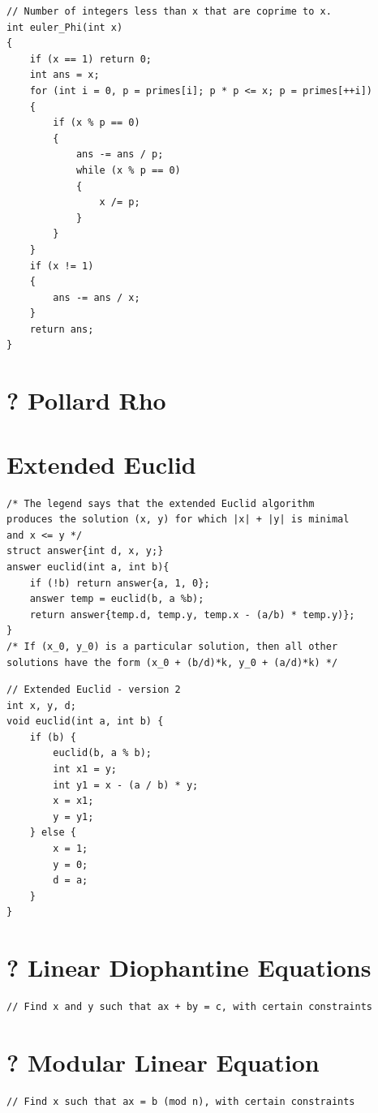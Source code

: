 \documentclass[12pt]{book}
\begin{document}
\begin{verbatim}
// Number of integers less than x that are coprime to x.
int euler_Phi(int x)
{
	if (x == 1) return 0;
	int ans = x;
	for (int i = 0, p = primes[i]; p * p <= x; p = primes[++i])
	{
		if (x % p == 0)
		{
			ans -= ans / p;
			while (x % p == 0)
			{
				x /= p;
			}
		}
	}
	if (x != 1)
	{
		ans -= ans / x;
	}
	return ans;
}
\end{verbatim}
\section{? Pollard Rho}
\section{Extended Euclid}
\begin{verbatim}
/* The legend says that the extended Euclid algorithm
produces the solution (x, y) for which |x| + |y| is minimal
and x <= y */
struct answer{int d, x, y;}
answer euclid(int a, int b){
	if (!b) return answer{a, 1, 0};
	answer temp = euclid(b, a %b);
	return answer{temp.d, temp.y, temp.x - (a/b) * temp.y)};
}
/* If (x_0, y_0) is a particular solution, then all other
solutions have the form (x_0 + (b/d)*k, y_0 + (a/d)*k) */
\end{verbatim}
\begin{verbatim}
// Extended Euclid - version 2
int x, y, d;
void euclid(int a, int b) {
	if (b) {
		euclid(b, a % b);
		int x1 = y;
		int y1 = x - (a / b) * y;
		x = x1;
		y = y1;
	} else {
		x = 1;
		y = 0;
		d = a;
	}
}
\end{verbatim}
\section{? Linear Diophantine Equations}
\begin{verbatim}
// Find x and y such that ax + by = c, with certain constraints
\end{verbatim}
\section{? Modular Linear Equation}
\begin{verbatim}
// Find x such that ax = b (mod n), with certain constraints
\end{verbatim}
\end{document}
